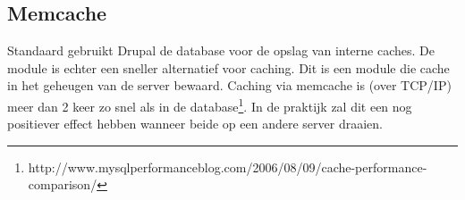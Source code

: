 \subsection{Memcache}\label{memcache}

Standaard gebruikt Drupal de database voor de opslag van interne caches. De  module is echter een sneller alternatief voor caching. Dit is een module die cache in het geheugen van de server bewaard. Caching via memcache is (over TCP/IP) meer dan 2 keer zo snel als in de database\footnote{http://www.mysqlperformanceblog.com/2006/08/09/cache-performance-comparison/}. In de praktijk zal dit een nog positiever effect hebben wanneer beide op een andere server draaien.
